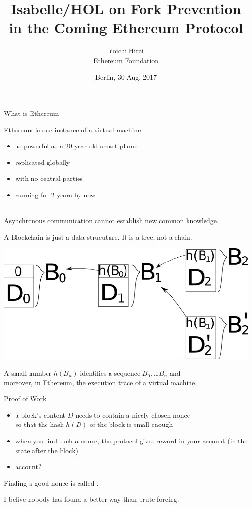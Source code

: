 \documentclass{beamer}
\title{Isabelle/HOL on Fork Prevention\\ in the Coming Ethereum Protocol}
\author{Yoichi Hirai\\ {\small Ethereum Foundation}}
\date{Berlin, 30 Aug. 2017}
\begin{document}
\begin{frame}
\titlepage
\end{frame}

\begin{frame}{What is Ethereum}

Ethereum is one-instance of a virtual machine
\begin{itemize}
\item as powerful as a 20-year-old smart phone
\item replicated globally
\item with no central parties
\item running for 2 years by now
\end{itemize}

\vfill

 \\
Asynchronous communication cannot establish new common knowledge.
\end{frame}

\begin{frame}{A Blockchain}
is just a data strucuture.  It is a tree, not a chain.

\includegraphics[width=\textwidth]{blockchains.png}

A small number $h(B_n)$ identifies a sequence $B_0, \ldots B_n$ and \\
moreover, in Ethereum, the execution trace of a virtual machine.

\end{frame}


\begin{frame}{Proof of Work}

\begin{itemize}
\item a block's content $D$ needs to contain a nicely chosen nonce\\ so that the hash $h(D)$ of the block is small enough
\item when you find such a nonce, the protocol gives reward in your account (in the state after the block)
\item account?
\end{itemize}

Finding a good nonce is called .

I belive nobody has found a better way than brute-forcing.
\end{frame}
\end{document}
